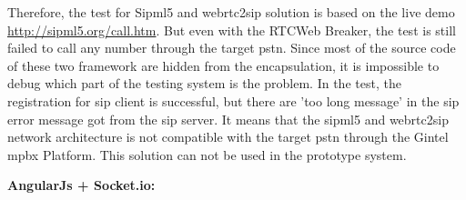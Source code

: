 \par Therefore, the test for Sipml5 and webrtc2sip solution is based on the live demo \url{http://sipml5.org/call.htm}. But even with the RTCWeb Breaker, the test is still failed to call any number through the target \gls{pstn}. Since most of the source code of these two framework are hidden from the encapsulation, it is impossible to debug which part of the testing system is the problem. In the test, the registration for \gls{sip} client is successful, but there are 'too long message' in the \gls{sip} error message got from the \gls{sip} server. It means that the sipml5 and webrtc2sip network architecture is not compatible with the target \gls{pstn} through the Gintel \gls{mpbx} Platform. This solution can not be used in the prototype system.

\textbf{AngularJs + Socket.io: }

\par